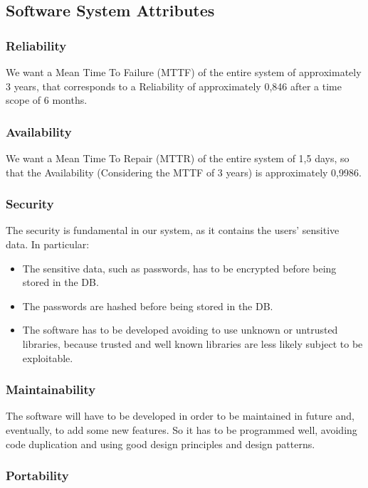 \documentclass[titlepage]{article}
\begin{document}
 
\subsection{Software System Attributes}
\subsubsection{Reliability}
We want a Mean Time To Failure (MTTF) of the entire system of approximately 3 years, that corresponds to a Reliability of approximately 0,846 after a time scope of 6 months.


\subsubsection{Availability}
We want a Mean Time To Repair (MTTR) of the entire system of 1,5 days, so that the Availability (Considering the MTTF of 3 years) is approximately 0,9986.

\subsubsection{Security}
The security is fundamental in our system, as it contains the users' sensitive data. In particular:
\begin{itemize}

\item The sensitive data, such as passwords, has to be encrypted before being stored in the DB.
\item The passwords are hashed before being stored in the DB.
\item The software has to be developed avoiding to use unknown or untrusted libraries, because trusted and well known libraries are less likely subject to be exploitable.
\end{itemize}


\subsubsection{Maintainability}
The software will have to be developed in order to be maintained in future and, eventually, to add some new features.
So it has to be programmed well, avoiding code duplication and using good design principles and design patterns.

\subsubsection{Portability}
\end{document}
